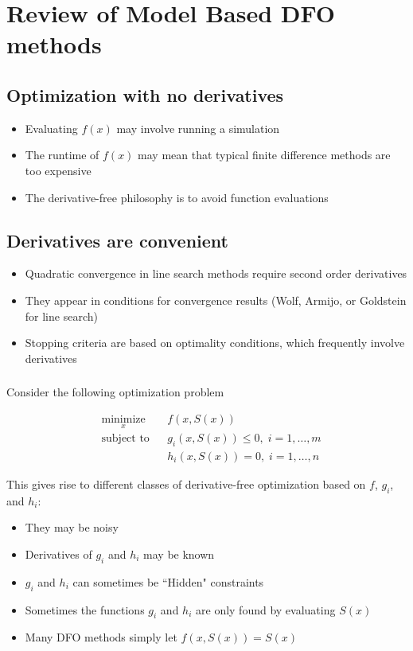 \documentclass{article} %
\begin{document}
\section{Review of Model Based DFO methods}


\subsection{Optimization with no derivatives}
\begin{itemize}
\item Evaluating $f(x)$ may involve running a simulation
\item The runtime of $f(x)$ may mean that typical finite difference methods are too expensive
\item The derivative-free philosophy is to avoid function evaluations
\end{itemize}


\subsection{Derivatives are convenient}

\begin{itemize}
\item Quadratic convergence in line search methods require second order derivatives
\item They appear in conditions for convergence results (Wolf, Armijo, or Goldstein for line search)
\item Stopping criteria are based on optimality conditions, which frequently involve derivatives
\end{itemize}

\subsubsection{}
Consider the following optimization problem

\begin{equation*}
\begin{aligned}
& \underset{x}{\text{minimize}} & & f(x, S(x)) \\
& \text{subject to} & & g_i(x, S(x)) \leq 0, \; i = 1, \ldots, m \\
& & & h_i(x, S(x)) = 0, \; i = 1, \ldots, n 
\end{aligned}
\end{equation*}

This gives rise to different classes of derivative-free optimization based on $f$, $g_i$, and $h_i$:
\begin{itemize}
\item They may be noisy
\item Derivatives of $g_i$ and $h_i$ may be known
\item $g_i$ and $h_i$ can sometimes be ``Hidden" constraints
\item Sometimes the functions $g_i$ and $h_i$ are only found by evaluating $S(x)$
\item Many DFO methods simply let $f(x,S(x)) = S(x)$
\end{itemize}
\end{document}
